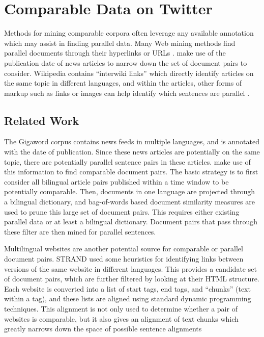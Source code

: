 \chapter{Comparable Data on Twitter}
\label{chap:twitter}

Methods for mining comparable corpora often leverage any available annotation
which may assist in finding parallel data. 
Many Web mining methods find parallel documents through their hyperlinks or
URLs \citep{Nie99,Chen00,Resnik99,Resnik03,Smith13}. \citet{Munteanu05} make use of the
publication date of news articles to narrow down the set of document pairs to
consider. Wikipedia contains ``interwiki links'' which directly identify
articles on the same topic in different languages, and within the articles,
other forms of markup such as links or images can help identify which
sentences are parallel \citep{Smith10}.

\section{Related Work}
The Gigaword corpus contains news feeds in multiple languages, and is annotated
with the date of publication. Since these news articles are potentially on the
same topic, there are potentially parallel sentence pairs in these articles.
\citet{Munteanu04,Munteanu05, Fung04a, Fung04b} make use of this information to
find comparable document pairs. The basic strategy is to first consider all
bilingual article pairs published within a time window to be potentially
comparable. Then, documents in one language are projected through a bilingual
dictionary, and bag-of-words based document similarity measures are used to
prune this large set of document pairs. This requires either existing parallel
data or at least a bilingual dictionary. Document pairs that pass through these
filter are then mined for parallel sentences.

Multilingual websites are another potential source for comparable or parallel
document pairs. STRAND \citep{Resnik03} used some heuristics for identifying
links between versions of the same website in different languages. This provides
a candidate set of document pairs, which are further filtered by looking at
their HTML structure. Each website is converted into a list of start tags, end
tags, and ``chunks'' (text within a tag), and these lists are aligned using
standard dynamic programming techniques. This alignment is not only used to
determine whether a pair of websites is comparable, but it also gives an
alignment of text chunks which greatly narrows down the space of possible
sentence alignments

